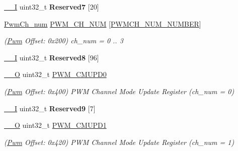 \begin{DoxyCompactItemize}
\mbox{\hyperlink{core__cm7_8h_af63697ed9952cc71e1225efe205f6cd3}{\+\_\+\+\_\+I}} uint32\+\_\+t {\bfseries Reserved7} \mbox{[}20\mbox{]}
\item 
\mbox{\label{structPwm_afb3c758a801d888de5d24e8b4ccf12cc}} 
\mbox{\hyperlink{structPwmCh__num}{Pwm\+Ch\+\_\+num}} \mbox{\hyperlink{structPwm_afb3c758a801d888de5d24e8b4ccf12cc}{P\+W\+M\+\_\+\+C\+H\+\_\+\+N\+UM}} \mbox{[}\mbox{\hyperlink{group__SAMS70__PWM_gaac490ccca2dabf7952b692754e13ef7a}{P\+W\+M\+C\+H\+\_\+\+N\+U\+M\+\_\+\+N\+U\+M\+B\+ER}}\mbox{]}
\begin{DoxyCompactList}\small\item\em (\mbox{\hyperlink{structPwm}{Pwm}} Offset\+: 0x200) ch\+\_\+num = 0 .. 3 \end{DoxyCompactList}\item 
\mbox{\label{structPwm_ac74bd2cd158e9c486844e9fff3a406ad}} 
\mbox{\hyperlink{core__cm7_8h_af63697ed9952cc71e1225efe205f6cd3}{\+\_\+\+\_\+I}} uint32\+\_\+t {\bfseries Reserved8} \mbox{[}96\mbox{]}
\item 
\mbox{\label{structPwm_a953079455e6417e6a2fd560524363563}} 
\mbox{\hyperlink{core__cm7_8h_a7e25d9380f9ef903923964322e71f2f6}{\+\_\+\+\_\+O}} uint32\+\_\+t \mbox{\hyperlink{structPwm_a953079455e6417e6a2fd560524363563}{P\+W\+M\+\_\+\+C\+M\+U\+P\+D0}}
\begin{DoxyCompactList}\small\item\em (\mbox{\hyperlink{structPwm}{Pwm}} Offset\+: 0x400) P\+WM Channel Mode Update Register (ch\+\_\+num = 0) \end{DoxyCompactList}\item 
\mbox{\label{structPwm_af1b0760ab0ec60f31f5f0eeb490ccfb4}} 
\mbox{\hyperlink{core__cm7_8h_af63697ed9952cc71e1225efe205f6cd3}{\+\_\+\+\_\+I}} uint32\+\_\+t {\bfseries Reserved9} \mbox{[}7\mbox{]}
\item 
\mbox{\label{structPwm_a4988962d16500530519049802c5daf34}} 
\mbox{\hyperlink{core__cm7_8h_a7e25d9380f9ef903923964322e71f2f6}{\+\_\+\+\_\+O}} uint32\+\_\+t \mbox{\hyperlink{structPwm_a4988962d16500530519049802c5daf34}{P\+W\+M\+\_\+\+C\+M\+U\+P\+D1}}
\begin{DoxyCompactList}\small\item\em (\mbox{\hyperlink{structPwm}{Pwm}} Offset\+: 0x420) P\+WM Channel Mode Update Register (ch\+\_\+num = 1) \end{DoxyCompactList}\item 

\end{DoxyCompactItemize}

